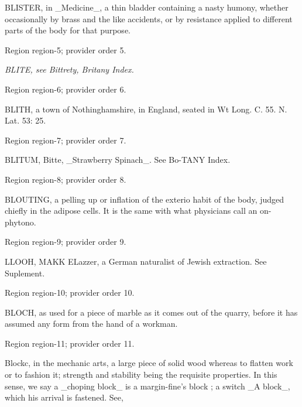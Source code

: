 \documentclass[11pt]{article}
\begin{document}
BLISTER, in \_Medicine\_, a thin bladder containing a nasty humony, whether occasionally by brass and the like accidents, or by resistance applied to different parts of the body for that purpose.
\par

{\scriptsize\color{gray} Region region-5; provider order 5.\par}
\medskip

{\small\itshape BLITE, see Bittrety, Britany Index.\par}

{\scriptsize\color{gray} Region region-6; provider order 6.\par}
\medskip

BLITH, a town of Nothinghamshire, in England, seated in Wt Long. C. 55. N. Lat. 53: 25.
\par

{\scriptsize\color{gray} Region region-7; provider order 7.\par}
\medskip

BLITUM, Bitte, \_Strawberry Spinach\_. See Bo-TANY Index.
\par

{\scriptsize\color{gray} Region region-8; provider order 8.\par}
\medskip

BLOUTING, a pelling up or inflation of the exterio habit of the body, judged chiefly in the adipose cells. It is the same with what physicians call an on- phytono.
\par

{\scriptsize\color{gray} Region region-9; provider order 9.\par}
\medskip

LLOOH, MAKK ELazzer, a German naturalist of Jewish extraction. See Suplement.
\par

{\scriptsize\color{gray} Region region-10; provider order 10.\par}
\medskip

BLOCH, as used for a piece of marble as it comes out of the quarry, before it has assumed any form from the hand of a workman.
\par

{\scriptsize\color{gray} Region region-11; provider order 11.\par}
\medskip

Blockc, in the mechanic arts, a large piece of solid wood whereas to flatten work or to fashion it; strength and stability being the requisite properties. In this sense, we say a \_choping block\_ is a margin-fine’s block ; a switch \_A block\_, which his arrival is fastened. See,
\par
\end{document}

